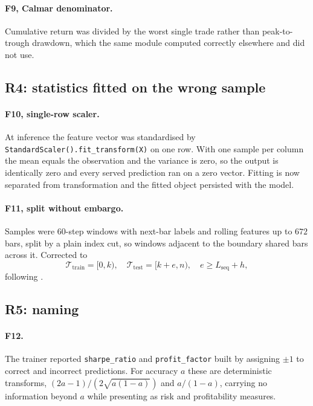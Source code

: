 \documentclass[preprint,12pt,authoryear]{elsarticle}
\begin{document}
\paragraph{F9, Calmar denominator.} Cumulative return was divided by the worst
single trade rather than peak-to-trough drawdown, which the same module computed
correctly elsewhere and did not use.

\subsection{R4: statistics fitted on the wrong sample}

\paragraph{F10, single-row scaler.} At inference the feature vector was
standardised by \texttt{StandardScaler().fit\_transform(X)} on one row. With one
sample per column the mean equals the observation and the variance is zero, so
the output is identically zero and every served prediction ran on a zero vector.
Fitting is now separated from transformation and the fitted object persisted with
the model.

\paragraph{F11, split without embargo.} Samples were $60$-step windows with
next-bar labels and rolling features up to $672$ bars, split by a plain index
cut, so windows adjacent to the boundary shared bars across it. Corrected to
\begin{equation}
\mathcal{T}_{\text{train}} = [0, k), \quad
\mathcal{T}_{\text{test}} = [k + e, n), \quad
e \ge L_{\text{seq}} + h,
\label{eq:embargo}
\end{equation}
following \citet{lopezdeprado2018advances}.

\subsection{R5: naming}

\paragraph{F12.} The trainer reported \texttt{sharpe\_ratio} and
\texttt{profit\_factor} built by assigning $\pm 1$ to correct and incorrect
predictions. For accuracy $a$ these are deterministic transforms,
$(2a-1)/(2\sqrt{a(1-a)})$ and $a/(1-a)$, carrying no information beyond $a$ while
presenting as risk and profitability measures.
\end{document}
